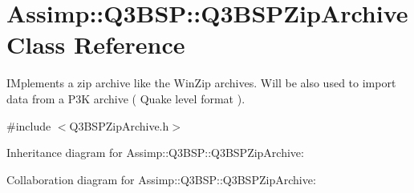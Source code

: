 \hypertarget{class_assimp_1_1_q3_b_s_p_1_1_q3_b_s_p_zip_archive}{\section{Assimp\+:\+:Q3\+B\+S\+P\+:\+:Q3\+B\+S\+P\+Zip\+Archive Class Reference}
\label{class_assimp_1_1_q3_b_s_p_1_1_q3_b_s_p_zip_archive}
}


I\+Mplements a zip archive like the Win\+Zip archives. Will be also used to import data from a P3\+K archive ( Quake level format ).  




{\ttfamily \#include $<$Q3\+B\+S\+P\+Zip\+Archive.\+h$>$}



Inheritance diagram for Assimp\+:\+:Q3\+B\+S\+P\+:\+:Q3\+B\+S\+P\+Zip\+Archive\+:


Collaboration diagram for Assimp\+:\+:Q3\+B\+S\+P\+:\+:Q3\+B\+S\+P\+Zip\+Archive\+:
